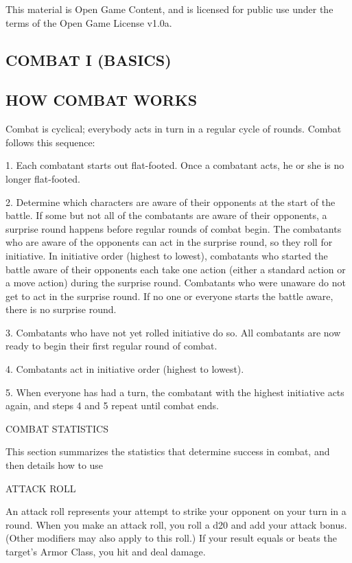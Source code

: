 \documentclass{article}
\begin{document}
This material is Open Game Content, and is licensed for public use under the terms 
of the Open Game License v1.0a.

\subsection*{{\LARGE{}COMBAT I (BASICS)}}

\vspace{12pt}
\subsection*{{\LARGE{}HOW COMBAT WORKS}}

Combat is cyclical; everybody acts in turn in a regular cycle of rounds. Combat 
follows this sequence:

1. Each combatant starts out flat-footed. Once a combatant acts, he or she is no 
longer flat-footed.

2. Determine which characters are aware of their opponents at the start of the 
battle. If some but not all of the combatants are aware of their opponents, a surprise 
round happens before regular rounds of combat begin. The combatants who are aware 
of the opponents can act in the surprise round, so they roll for initiative. In 
initiative order (highest to lowest), combatants who started the battle aware of 
their opponents each take one action (either a standard action or a move action) 
during the surprise round. Combatants who were unaware do not get to act in the 
surprise round. If no one or everyone starts the battle aware, there is no surprise 
round.

3. Combatants who have not yet rolled initiative do so. All combatants are now 
ready to begin their first regular round of combat.

4. Combatants act in initiative order (highest to lowest).

5. When everyone has had a turn, the combatant with the highest initiative acts 
again, and steps 4 and 5 repeat until combat ends.

\vspace{12pt}
{\LARGE{}COMBAT STATISTICS}

This section summarizes the statistics that determine success in combat, and then 
details how to use

\vspace{12pt}
ATTACK ROLL

An attack roll represents your attempt to strike your opponent on your turn in 
a round. When you make an attack roll, you roll a d20 and add your attack bonus. 
(Other modifiers may also apply to this roll.) If your result equals or beats the 
target's Armor Class, you hit and deal damage.
\end{document}
